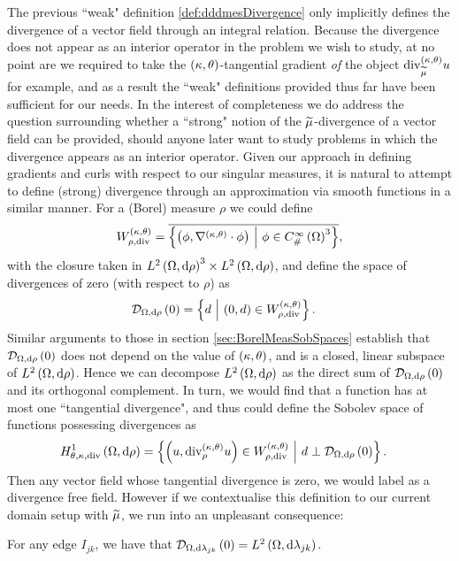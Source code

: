 The previous ``weak" definition \ref{def:dddmesDivergence} only implicitly defines the divergence of a vector field through an integral relation.
Because the divergence does not appear as an interior operator in the problem we wish to study, at no point are we required to take the $\left( \kappa, \theta \right)$-tangential gradient \emph{of} the object $\mathrm{div}_{\widetilde{\mu}}^{\left( \kappa, \theta \right)}u$ for example, and as a result the ``weak" definitions provided thus far have been sufficient for our needs.
In the interest of completeness we do address the question surrounding whether a ``strong" notion of the $\widetilde{\mu}$-divergence of a vector field can be provided, should anyone later want to study problems in which the divergence appears as an interior operator.
Given our approach in defining gradients and curls with respect to our singular measures, it is natural to attempt to define (strong) divergence through an approximation via smooth functions in a similar manner.
For a (Borel) measure $\rho$ we could define
\begin{align*}
	W_{\rho,\mathrm{div}}^{\left( \kappa, \theta \right)} = \overline{\left\{  \left( \phi,\nabla^{\left( \kappa, \theta \right)}\cdot\phi \right) \ \middle\vert \  \phi\in C^{\infty}_{\#}\left( \Omega \right)^3  \right\}},
\end{align*}
with the closure taken in $L^{2}\left( \Omega,\mathrm{d} \rho \right)^3\times L^{2}\left( \Omega,\mathrm{d} \rho \right)$, and define the space of divergences of zero (with respect to $\rho$) as
\begin{align*}
	\mathcal{D}_{\Omega,\mathrm{d}\rho}\left( 0 \right) &= \left\{ d \ \middle\vert \  \left( 0,d \right)\in W_{\rho,\mathrm{div}}^{\left( \kappa, \theta \right)} \right\}.
\end{align*}
Similar arguments to those in section \ref{sec:BorelMeasSobSpaces} establish that $\mathcal{D}_{\Omega,\mathrm{d}\rho}\left( 0 \right)$ does not depend on the value of $\left( \kappa, \theta \right)$, and is a closed, linear subspace of $L^{2}\left( \Omega,\mathrm{d} \rho \right)$.
Hence we can decompose $L^{2}\left( \Omega,\mathrm{d} \rho \right)$ as the direct sum of $\mathcal{D}_{\Omega,\mathrm{d}\rho}\left( 0 \right)$ and its orthogonal complement.
In turn, we would find that a function has at most one ``tangential divergence", and thus could define the Sobolev space of functions possessing divergences as
\begin{align*}
	H^1_{\theta,\kappa,\mathrm{div}}\left( \Omega,\mathrm{d}\rho \right)
	&= \left\{  \left( u,\mathrm{div}_{\rho}^{\left( \kappa, \theta \right)}u \right)\in W_{\rho,\mathrm{div}}^{\left( \kappa, \theta \right)} \ \middle\vert \  d\perp\mathcal{D}_{\Omega,\mathrm{d}\rho}\left( 0 \right)  \right\}.
\end{align*}
Then any vector field whose tangential divergence is zero, we would label as a divergence free field.
However if we contextualise this definition to our current domain setup with $\widetilde{\mu}$, we run into an unpleasant consequence:
\begin{lemma} \label{lem:DivZero-Everything}
	For any edge $I_{jk}$, we have that $\mathcal{D}_{\Omega,\mathrm{d}\lambda_{jk}}\left( 0 \right)=L^{2}\left( \Omega,\mathrm{d} \lambda_{jk} \right)$.
\end{lemma}
